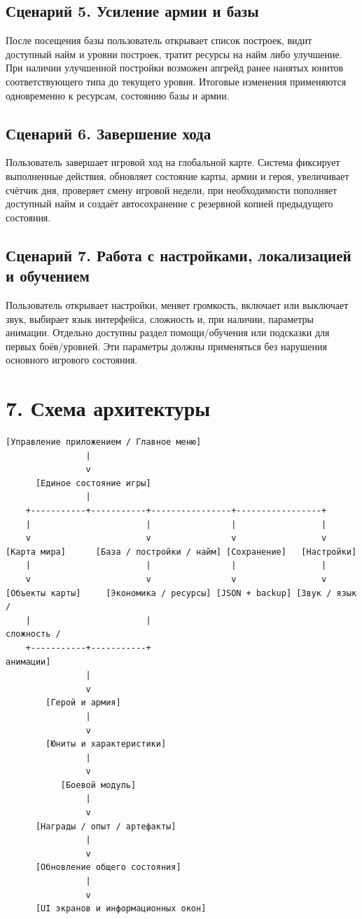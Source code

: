 \documentclass[12pt,a4paper]{article}
\begin{document}
\subsection*{Сценарий 5. Усиление армии и базы}

После посещения базы пользователь открывает список построек, видит доступный найм и уровни построек, тратит ресурсы на найм либо улучшение. При наличии улучшенной постройки возможен апгрейд ранее нанятых юнитов соответствующего типа до текущего уровня. Итоговые изменения применяются одновременно к ресурсам, состоянию базы и армии.

\subsection*{Сценарий 6. Завершение хода}

Пользователь завершает игровой ход на глобальной карте. Система фиксирует выполненные действия, обновляет состояние карты, армии и героя, увеличивает счётчик дня, проверяет смену игровой недели, при необходимости пополняет доступный найм и создаёт автосохранение с резервной копией предыдущего состояния.

\subsection*{Сценарий 7. Работа с настройками, локализацией и обучением}

Пользователь открывает настройки, меняет громкость, включает или выключает звук, выбирает язык интерфейса, сложность и, при наличии, параметры анимации. Отдельно доступны раздел помощи/обучения или подсказки для первых боёв/уровней. Эти параметры должны применяться без нарушения основного игрового состояния.

\section*{7. Схема архитектуры}

\begin{verbatim}
[Управление приложением / Главное меню]
                |
                v
      [Единое состояние игры]
                |
    +-----------+-----------+----------------+-----------------+
    |                       |                |                 |
    v                       v                v                 v
[Карта мира]      [База / постройки / найм] [Сохранение]   [Настройки]
    |                       |                |                 |
    v                       v                v                 v
[Объекты карты]     [Экономика / ресурсы] [JSON + backup] [Звук / язык /
    |                       |                                  сложность /
    +-----------+-----------+                                  анимации]
                |
                v
        [Герой и армия]
                |
                v
        [Юниты и характеристики]
                |
                v
           [Боевой модуль]
                |
                v
      [Награды / опыт / артефакты]
                |
                v
      [Обновление общего состояния]
                |
                v
      [UI экранов и информационных окон]
\end{verbatim}
\end{document}
